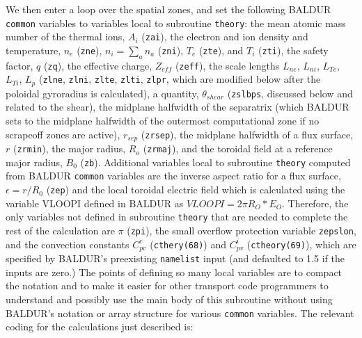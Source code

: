 We then enter a loop over the spatial zones,
and set the following BALDUR {\tt common} variables
to variables local to subroutine {\tt theory}: the
mean atomic mass number of the thermal ions, $A_{i}$ ({\tt zai}),
the electron
and ion density and temperature, $n_{e}$ ({\tt zne}),
$n_{i}=\sum_{a}n_{a}$ ({\tt zni}),
$T_{e}$ ({\tt zte}), and $T_{i}$ ({\tt zti}),
the safety factor, $q$ ({\tt zq}),
the effective charge, $Z_{eff}$ ({\tt zeff}),
the scale lengths $L_{ne}$, $L_{ni}$, $L_{Te}$, $L_{Ti}$, $L_{p}$
({\tt zlne}, {\tt zlni}, {\tt zlte}, {\tt zlti}, {\tt zlpr}, which
are modified below after the poloidal gyroradius is calculated),
a quantity, $\theta_{shear}$ ({\tt zslbps},
discussed below and related to the shear),
the midplane halfwidth of the separatrix
(which BALDUR sets to the midplane halfwidth
of the outermost computational zone
if no scrapeoff zones are active), $r_{sep}$ ({\tt zrsep}),
the midplane halfwidth of a flux surface, $r$ ({\tt zrmin}),
the major radius, $R_{o}$ ({\tt zrmaj}), and
the toroidal field at a reference major radius, $B_{0}$ ({\tt zb}).
Additional variables local to subroutine {\tt theory} computed
from BALDUR {\tt common} variables are the inverse aspect
ratio for a flux surface, $\epsilon=r/R_{0}$ ({\tt zep})
and the local toroidal
electric field which is calculated using the variable VLOOPI
defined in BALDUR as $VLOOPI=2 \pi R_{O}*E_{O}.$
Therefore, the only variables not defined in subroutine
{\tt theory} that are needed to complete the rest of the
calculation are $\pi$ ({\tt zpi}), the small overflow
protection variable {\tt zepslon}, and the convection
constants $C_{pv}^{e}$ ({\tt cthery(68)}) 
and $C_{pv}^{i}$ ({\tt ctheory(69)}),
which are specified by BALDUR's preexisting {\tt namelist}
input (and defaulted to 1.5 if the inputs are zero.)
The points of defining so many local variables
are to compact the notation and to make it easier for other
transport code programmers to understand and possibly use
the main body of this subroutine without using BALDUR's
notation or array structure for various {\tt common} variables.
The relevant coding for the calculations just described is:

